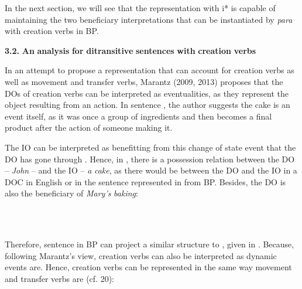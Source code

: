 \documentclass[output=paper,modfonts,nonflat]{langsci/langscibook}
\begin{document}
        

\begin{styleHTMLPreformatted}
In the next section, we will see that the representation with i* is capable of maintaining the two beneficiary interpretations that can be instantiated by \textit{para} with creation verbs in BP.
\end{styleHTMLPreformatted}

\textbf{3.2.} \textbf{An} \textbf{analysis} \textbf{for} \textbf{ditransitive} \textbf{sentences} \textbf{with} \textbf{creation} \textbf{verbs} 

In an attempt to propose a representation that can account for creation verbs as well as movement and transfer verbs, Marantz (2009, 2013) proposes that the DOs of creation verbs can be interpreted as eventualities, as they represent the object resulting from an action. In sentence , the author suggests the cake is an event itself, as it was once a group of ingredients and then becomes a final product after the action of someone making it.

The IO can be interpreted as benefitting from this change of state event that the DO has gone through \citep[156]{Marantz2013}. Hence, in , there is a possession relation between the DO – \textit{John} – and the IO – \textit{a} \textit{cake}, as there would be between the DO and the IO in a DOC in English or in the sentence represented in  from BP. Besides, the DO is also the beneficiary of \textit{Mary’s} \textit{baking}:

 

\ea%
    \label{ex:key:19}
    \gll\\
        \\
    \glt
    \z

         

Therefore, sentence  in BP can project a similar structure to , given in . Because, following Marantz’s view, creation verbs can also be interpreted as dynamic events are. Hence, creation verbs can be represented in the same way movement and transfer verbs are (cf. 20):

\ea%
    \label{ex:key:20}
    \gll\\
        \\
    \glt
    \z

        
\end{document}
